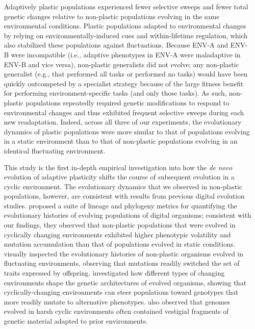 Adaptively plastic populations experienced fewer selective sweeps and fewer total genetic changes relative to non-plastic populations evolving in the same environmental conditions.
Plastic populations adapted to environmental changes by relying on environmentally-induced cues and within-lifetime regulation, which also stabilized these populations against fluctuations. 
Because ENV-A and ENV-B were incompatible (i.e., adaptive phenotypes in ENV-A were maladaptive in ENV-B and vice versa), non-plastic generalists did not evolve; any non-plastic generalist (e.g., that performed all tasks or performed no tasks) would have been quickly outcompeted by a specialist strategy because of the large fitness benefit for performing environment-specific tasks (and only those tasks).
As such, non-plastic populations repeatedly required genetic modifications to respond to environmental changes and thus exhibited frequent selective sweeps during each new readaptation.
Indeed, across all three of our experiments, the evolutionary dynamics of plastic populations were more similar to that of populations evolving in a static environment than to that of non-plastic populations evolving in an identical fluctuating environment.


This study is the first in-depth empirical investigation into how the \textit{de novo} evolution of adaptive plasticity shifts the course of subsequent evolution in a cyclic environment.
The evolutionary dynamics that we observed in non-plastic populations, however, are consistent with results from previous digital evolution studies. 
\cite{dolson_interpreting_2020} proposed a suite of lineage and phylogeny metrics for quantifying the evolutionary histories of evolving populations of digital organisms; consistent with our findings, they observed that non-plastic populations that were evolved in cyclically changing environments exhibited higher phenotypic volatility and mutation accumulation than that of populations evolved in static conditions.
\cite{lalejini_evolutionary_2016} visually inspected the evolutionary histories of non-plastic organisms evolved in fluctuating environments, observing that mutations readily switched the set of traits expressed by offspring.
\cite{canino-koning_evolution_2016} investigated how different types of changing environments shape the genetic architectures of evolved organisms, showing that cyclically-changing environments can steer populations toward genotypes that more readily mutate to alternative phenotypes.
\cite{canino-koning_evolution_2016} also observed that genomes evolved in harsh cyclic environments often contained vestigial fragments of genetic material adapted to prior environments.

